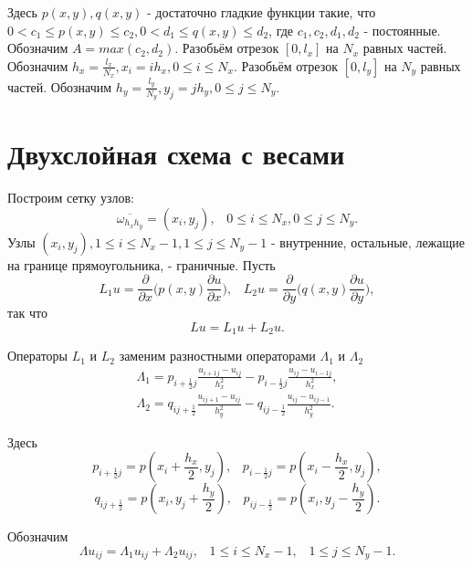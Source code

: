 \documentclass[a4paper, 12pt]{article}
\begin{document}
	
	Здесь $p(x, y), q(x, y)$ - достаточно гладкие функции такие, что $0 < c_1 \le p(x, y) \le c_2, 0 < d_1 \le q(x, y) \le d_2$, где $c_1, c_2, d_1, d_2$ - постоянные.
	Обозначим $A = max(c_2, d_2)$.
	Разобьём отрезок $[0, l_x]$ на $N_x$ равных частей. Обозначим $h_x = \frac{l_x}{N_x}, x_i = i h_x, 0 \le i \le N_x.$
	\newline
	Разобьём отрезок $[0, l_y]$ на $N_y$ равных частей. Обозначим $h_y = \frac{l_y}{N_y}, y_j = j h_y, 0 \le j \le N_y.$
	\newline
	
	\section{Двухслойная схема с весами}
	Построим сетку узлов:
	\begin{equation*}
		\overline{\omega_{h_x h_y}} = {(x_i, y_j), \;\;\; 0 \le i \le N_x, 0 \le j \le N_y}.
	\end{equation*}
	\newline
	Узлы $(x_i, y_j), 1 \le i \le N_x-1, 1 \le j \le N_y-1$ - внутренние, остальные, лежащие на границе прямоугольника, - граничные.
	\newline
	Пусть
	\begin{equation}
		L_1u = \frac{\partial}{\partial x} \bigg( p(x, y) \frac{\partial u}{\partial x} \bigg), \;\;\; L_2u = \frac{\partial}{\partial y} \bigg( q(x, y) \frac{\partial u}{\partial y} \bigg),
	\end{equation}
	так что
	\begin{equation}
		Lu = L_1u + L_2u.
	\end{equation}
	
	Операторы $L_1$ и $L_2$ заменим разностными операторами $\Lambda_1$ и $\Lambda_2$
	\begin{eqnarray}
		\Lambda_1 = p_{i+\frac{1}{2} j} \frac{u_{i+1 j} - u_{i j}}{h^2_x} - p_{i-\frac{1}{2} j} \frac{u_{i j} - u_{i-1 j}}{h^2_x}, \\
		\Lambda_2 = q_{i j+\frac{1}{2}} \frac{u_{i j+1} - u_{i j}}{h^2_y} - q_{i j-\frac{1}{2}} \frac{u_{i j} - u_{i j-1}}{h^2_y}.
	\end{eqnarray}
	
	Здесь
	$$ p_{i+\frac{1}{2} j} = p(x_i + \frac{h_x}{2}, y_j), \;\;\; p_{i-\frac{1}{2} j} = p(x_i - \frac{h_x}{2}, y_j), $$
	$$ q_{i j+\frac{1}{2}} = p(x_i , y_j+ \frac{h_y}{2}), \;\;\; p_{i j-\frac{1}{2}} = p(x_i , y_j- \frac{h_y}{2}).$$
	
	Обозначим
	$$ \Lambda u_{i j} = \Lambda_1 u_{i j} + \Lambda_2 u_{i j}, \;\;\; 1 \le i \le N_x-1, \;\;\; 1 \le j \le N_y-1.$$
	
\end{document}

